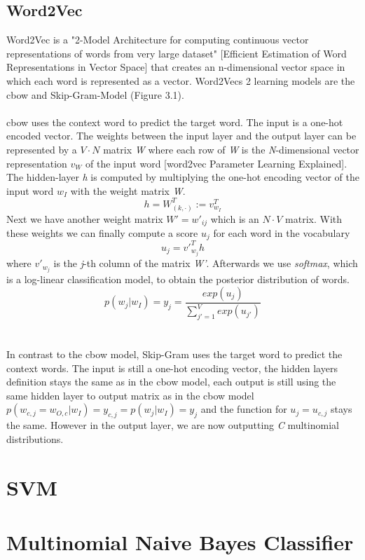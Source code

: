 \documentclass[a4paper, 11pt,titlepage,oneside,openany]{book}
\begin{document}
\subsection{Word2Vec}
Word2Vec is a "2-Model Architecture for computing continuous vector representations of words from very large dataset" [Efficient Estimation of Word Representations in Vector Space] that creates an n-dimensional vector space in which each word is represented as a vector. Word2Vecs 2 learning models are the \gls{cbow} and Skip-Gram-Model (Figure 3.1).\\
\\
\noindent \gls{cbow} uses the context word to predict the target word. The input is a one-hot encoded vector. The weights between the input layer and the output layer can be represented by a $V \cdot N$ matrix \textit{W} where each row of \textit{W} is the \textit{N}-dimensional vector representation $v_W$ of the input word [word2vec Parameter Learning Explained]. The hidden-layer \textit{h} is computed by multiplying the one-hot encoding vector of the input word $w_I$ with the weight matrix \textit{W}.
\[
h=W_{(k, \cdot)}^{T}:=v_{w_I}^{T}
\] 
Next we have another weight matrix $W'={w'_{ij}}$ which is an $N \cdot V$ matrix. With these weights we can finally compute a score $u_j$ for each word in the vocabulary
\[
u_{j}={v'}_{w_j}^{T}h
\] where ${v'}_{w_j}$ is the \textit{j}-th column of the matrix \textit{W'}. Afterwards we use \textit{softmax}, which is a log-linear classification model, to obtain the posterior distribution of words.
\[
p(w_j|w_I)=y_j=\frac{exp(u_j)}{\sum_{j'=1}^V exp(u_{j'})}
\] \\
\\
\noindent In contrast to the \gls{cbow} model,  Skip-Gram uses the target word to predict the context words. The input is still a one-hot encoding vector, the hidden layers definition stays the same as in the \gls{cbow} model, each output is still using the same hidden layer to output matrix as in the \gls{cbow} model $p(w_{c,j}=w_{O,c}|w_I)=y_{c,j} = p(w_j|w_I)=y_j$ and the function for $u_j=u_{c,j}$ stays the same. However in the output layer, we are now outputting \textit{C} multinomial distributions. 
\section{SVM}
\section{Multinomial Naive Bayes Classifier}
\end{document}
